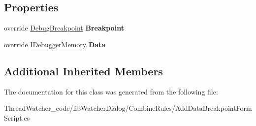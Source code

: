 \subsection*{Properties}
\begin{DoxyCompactItemize}
\item 
\hypertarget{classlib_watcher_dialog_1_1_combine_rules_1_1_add_data_breakpoint_form_script_ae8c8de927bc7bd88a71692f187fafdb9}{override \hyperlink{classlib_wather_debugger_1_1_breakpoint_1_1_debug_breakpoint}{Debug\+Breakpoint} {\bfseries Breakpoint}}\label{classlib_watcher_dialog_1_1_combine_rules_1_1_add_data_breakpoint_form_script_ae8c8de927bc7bd88a71692f187fafdb9}

\item 
\hypertarget{classlib_watcher_dialog_1_1_combine_rules_1_1_add_data_breakpoint_form_script_a6a44b0ba1ab6587f5e29dcc568179857}{override \hyperlink{interfacelib_utilities_1_1_i_debugger_memory}{I\+Debugger\+Memory} {\bfseries Data}}\label{classlib_watcher_dialog_1_1_combine_rules_1_1_add_data_breakpoint_form_script_a6a44b0ba1ab6587f5e29dcc568179857}

\end{DoxyCompactItemize}
\subsection*{Additional Inherited Members}


The documentation for this class was generated from the following file\+:\begin{DoxyCompactItemize}
\item 
Thread\+Watcher\+\_\+code/lib\+Watcher\+Dialog/\+Combine\+Rules/Add\+Data\+Breakpoint\+Form\+Script.\+cs\end{DoxyCompactItemize}
